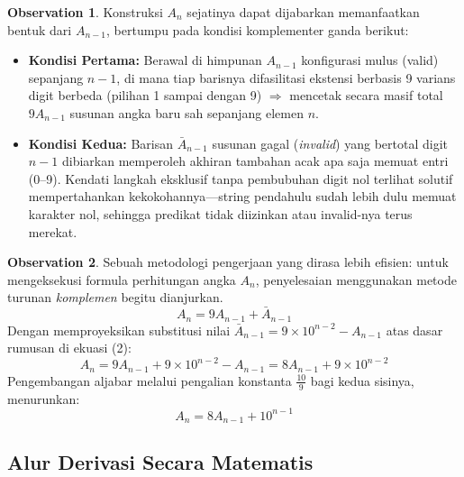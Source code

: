 \documentclass[12pt,a4paper]{article}
\theoremstyle{definition}
\newtheorem{observation}{Observation}[section]
\begin{document}
\begin{observation}
  Konstruksi $A_n$ sejatinya dapat dijabarkan memanfaatkan bentuk dari $A_{n-1}$, 
  bertumpu pada kondisi komplementer ganda berikut:
  \begin{itemize}
    \item \textbf{Kondisi Pertama:} Berawal di himpunan $A_{n-1}$ konfigurasi mulus (valid) 
          sepanjang $n-1$, di mana tiap barisnya difasilitasi ekstensi berbasis 
          9 varians digit berbeda (pilihan 1 sampai dengan 9) 
          $\Rightarrow$ mencetak secara masif total $9A_{n-1}$ susunan angka baru sah 
          sepanjang elemen $n$.
    \item \textbf{Kondisi Kedua:} Barisan $\bar{A}_{n-1}$ susunan gagal (\emph{invalid}) 
          yang bertotal digit $n-1$ dibiarkan memperoleh akhiran tambahan acak apa 
          saja memuat entri (0--9). Kendati langkah eksklusif tanpa pembubuhan digit 
          nol terlihat solutif mempertahankan kekokohannya—string pendahulu sudah 
          lebih dulu memuat karakter nol, sehingga predikat tidak diizinkan atau 
          invalid-nya terus merekat.
  \end{itemize}
\end{observation}

\begin{observation}
  Sebuah metodologi pengerjaan yang dirasa lebih efisien: untuk mengeksekusi 
  formula perhitungan angka $A_n$, penyelesaian menggunakan metode turunan \emph{komplemen} 
  begitu dianjurkan.
  \begin{equation}
    A_n = 9A_{n-1} + \bar{A}_{n-1}
  \end{equation}
  Dengan memproyeksikan substitusi nilai $\bar{A}_{n-1} = 9 \times 10^{n-2} - A_{n-1}$ 
  atas dasar rumusan di ekuasi (2):
  \begin{equation}
    A_n = 9A_{n-1} + 9 \times 10^{n-2} - A_{n-1} = 8A_{n-1} + 9 \times 10^{n-2}
  \end{equation}
  Pengembangan aljabar melalui pengalian konstanta $\tfrac{10}{9}$ bagi 
  kedua sisinya, menurunkan:
  \begin{equation}
    A_n = 8A_{n-1} + 10^{n-1}
  \end{equation}
\end{observation}

\subsection{Alur Derivasi Secara Matematis}
\end{document}
